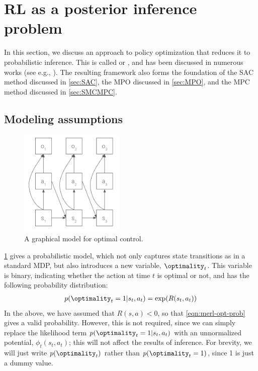 \section{RL as a posterior inference problem}
\label{sec:inferRL}
\label{sec:planningAsInference}
\label{sec:RLAI}


In this section, we discuss an approach to
policy optimization that reduces it
to probabilistic inference.
This is called 
or ,
and has been discussed in numerous works
(see e.g., \citep{Attias03,Toussaint06,Toussaint09Robot,Ziebart2010,
  Rawlik2012,Botvinick2012,Kappen2012,Hoffmann2017control,Levine2018inf,Watson2021}).
The resulting framework also forms the foundation
of the SAC method discussed in \cref{sec:SAC},
the MPO discussed in \cref{sec:MPO},
and the MPC method discussed in \cref{sec:SMCMPC}.

\subsection{Modeling assumptions}


\begin{figure}
\centering
\includegraphics[height=2in]{figs/RLAIdieterich.png}
\caption{
  A graphical model for optimal control.
}
\label{fig:levine-rl-pgm}
\end{figure}

\cref{fig:levine-rl-pgm} gives a probabilistic model,
which not only captures state transitions as in a standard MDP,
but also introduces a new variable, $\optimality_t$.
This variable is binary, indicating whether the action at time $t$ is optimal or not, and has the following probability distribution:
\begin{align}
\label{eqn:merl-opt-prob}
p(\optimality_t=1 | s_t,a_t) = \exp( R(s_t,a_t))
\end{align}
In the above, we have assumed 
that $R(s,a) < 0$,
so that \cref{eqn:merl-opt-prob} gives a valid probability.
However, this is not required, since we can simply replace the
likelihood term
$p(\optimality_t=1 | s_t,a_t)$
with an unnormalized potential, $\phi_t(s_t,a_t)$;
this will not affect the results of inference.
For brevity, we will just write $p(\optimality_t)$
rather than $p(\optimality_t=1)$, since 1 is just a dummy value.


